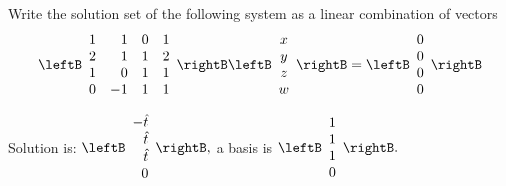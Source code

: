 \begin{enumialphparenastyle}
\begin{ex} \label{exerlineartransf9}Write the solution set of the following system as a linear combination of vectors
\begin{equation*}
\leftB
\begin{array}{rrrr}
1 & 1 & 0 & 1 \\
2 & 1 & 1 & 2 \\
1 & 0 & 1 & 1 \\
0 & -1 & 1 & 1
\end{array}
\rightB \leftB
\begin{array}{c}
x \\
y \\
z \\
w
\end{array}
\rightB =\leftB
\begin{array}{r}
0 \\
0 \\
0 \\
0
\end{array}
\rightB 
\end{equation*}
\begin{sol}
Solution is: $\leftB
\begin{array}{r}
-\hat{t} \\
\hat{t} \\
\hat{t} \\
0
\end{array}
\rightB ,$ a basis is $\leftB
\begin{array}{c}
1 \\
1 \\
1 \\
0
\end{array}
\rightB .$
\end{sol}
\end{ex}


\end{enumialphparenastyle}

